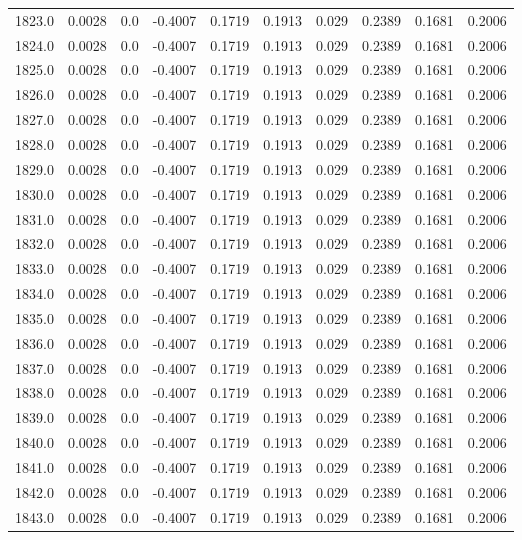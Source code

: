 \begin{longtable}{lrrrrrrrrr}
1823.0 & 0.0028 & 0.0 & -0.4007 & 0.1719 & 0.1913 & 0.029 & 0.2389 & 0.1681 & 0.2006 \\
1824.0 & 0.0028 & 0.0 & -0.4007 & 0.1719 & 0.1913 & 0.029 & 0.2389 & 0.1681 & 0.2006 \\
1825.0 & 0.0028 & 0.0 & -0.4007 & 0.1719 & 0.1913 & 0.029 & 0.2389 & 0.1681 & 0.2006 \\
1826.0 & 0.0028 & 0.0 & -0.4007 & 0.1719 & 0.1913 & 0.029 & 0.2389 & 0.1681 & 0.2006 \\
1827.0 & 0.0028 & 0.0 & -0.4007 & 0.1719 & 0.1913 & 0.029 & 0.2389 & 0.1681 & 0.2006 \\
1828.0 & 0.0028 & 0.0 & -0.4007 & 0.1719 & 0.1913 & 0.029 & 0.2389 & 0.1681 & 0.2006 \\
1829.0 & 0.0028 & 0.0 & -0.4007 & 0.1719 & 0.1913 & 0.029 & 0.2389 & 0.1681 & 0.2006 \\
1830.0 & 0.0028 & 0.0 & -0.4007 & 0.1719 & 0.1913 & 0.029 & 0.2389 & 0.1681 & 0.2006 \\
1831.0 & 0.0028 & 0.0 & -0.4007 & 0.1719 & 0.1913 & 0.029 & 0.2389 & 0.1681 & 0.2006 \\
1832.0 & 0.0028 & 0.0 & -0.4007 & 0.1719 & 0.1913 & 0.029 & 0.2389 & 0.1681 & 0.2006 \\
1833.0 & 0.0028 & 0.0 & -0.4007 & 0.1719 & 0.1913 & 0.029 & 0.2389 & 0.1681 & 0.2006 \\
1834.0 & 0.0028 & 0.0 & -0.4007 & 0.1719 & 0.1913 & 0.029 & 0.2389 & 0.1681 & 0.2006 \\
1835.0 & 0.0028 & 0.0 & -0.4007 & 0.1719 & 0.1913 & 0.029 & 0.2389 & 0.1681 & 0.2006 \\
1836.0 & 0.0028 & 0.0 & -0.4007 & 0.1719 & 0.1913 & 0.029 & 0.2389 & 0.1681 & 0.2006 \\
1837.0 & 0.0028 & 0.0 & -0.4007 & 0.1719 & 0.1913 & 0.029 & 0.2389 & 0.1681 & 0.2006 \\
1838.0 & 0.0028 & 0.0 & -0.4007 & 0.1719 & 0.1913 & 0.029 & 0.2389 & 0.1681 & 0.2006 \\
1839.0 & 0.0028 & 0.0 & -0.4007 & 0.1719 & 0.1913 & 0.029 & 0.2389 & 0.1681 & 0.2006 \\
1840.0 & 0.0028 & 0.0 & -0.4007 & 0.1719 & 0.1913 & 0.029 & 0.2389 & 0.1681 & 0.2006 \\
1841.0 & 0.0028 & 0.0 & -0.4007 & 0.1719 & 0.1913 & 0.029 & 0.2389 & 0.1681 & 0.2006 \\
1842.0 & 0.0028 & 0.0 & -0.4007 & 0.1719 & 0.1913 & 0.029 & 0.2389 & 0.1681 & 0.2006 \\
1843.0 & 0.0028 & 0.0 & -0.4007 & 0.1719 & 0.1913 & 0.029 & 0.2389 & 0.1681 & 0.2006 \\

\end{longtable}
